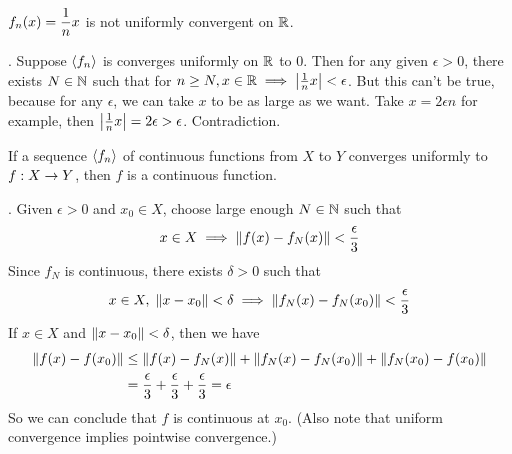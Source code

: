  \(\displaystyle f_n(x) = \frac{1}{n}x\) is not uniformly convergent on \(\mathbb{R}\).

\pf. Suppose \(\left\langle f_n \right\rangle\) is converges uniformly on \(\mathbb{R}\) to 0. Then for any given \(\epsilon > 0\), there exists \(N\in\mathbb{N}\) such that for \(n\geq N, x\in \mathbb{R} \implies \left|\frac{1}{n}x\right| < \epsilon\). But this can't be true, because for any \(\epsilon\), we can take \(x\) to be as large as we want. Take \(x = 2\epsilon n\) for example, then \(\left|\frac{1}{n}x\right| = 2\epsilon > \epsilon\). Contradiction.

 If a sequence \(\left\langle f_n \right\rangle\) of continuous functions from \(X\) to \(Y\) converges uniformly to \(f: X \rightarrow Y\), then \(f\) is a continuous function.

\pf. Given \(\epsilon > 0\) and \(x_0 \in X\), choose large enough \(N\in\mathbb{N}\) such that
\[
	x \in X \implies \left\lVert f(x) - f_N(x)\right\rVert < \frac{\epsilon}{3}
\]
Since \(f_N\) is continuous, there exists \(\delta > 0\) such that
\[
	x\in X,\; \left\lVert x - x_0\right\rVert < \delta \implies \left\lVert f_N(x) - f_N(x_0)\right\rVert < \frac{\epsilon}{3}
\]
If \(x\in X\) and \(\left\lVert x - x_0\right\rVert < \delta\), then we have
\[
	\begin{aligned}
		\left\lVert f(x) - f(x_0)\right\rVert & \leq \left\lVert f(x) - f_N(x)\right\rVert + \left\lVert f_N(x) - f_N(x_0)\right\rVert + \left\lVert f_N(x_0) -f(x_0)\right\rVert \\
		                     & = \frac{\epsilon}{3} + \frac{\epsilon}{3} + \frac{\epsilon}{3} = \epsilon
	\end{aligned}
\]
So we can conclude that \(f\) is continuous at \(x_0\). (Also note that uniform convergence implies pointwise convergence.)

